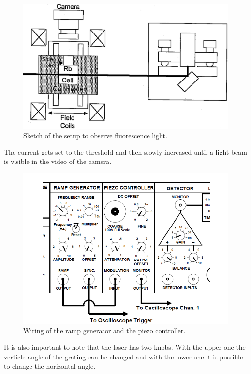 \begin{figure}[H]
	\centering
	\includegraphics[width=\textwidth]{setup_fluorescence.png}
	\caption{Sketch of the setup to observe fluorescence light. \cite{V60}}
	\label{fig:fl}
\end{figure}

\noindent
The current gets set to the threshold and then slowly increased until a light beam is visible in the video of the 
camera.

\begin{figure}[H]
	\centering
	\includegraphics[width=\textwidth]{setup.png}
	\caption{Wiring of the ramp generator and the piezo controller. \cite{V60}}
	\label{fig:rg}
\end{figure}

\noindent
It is also important to note that the laser has two knobs. With the upper one the verticle angle of the grating can
be changed and with the lower one it is possible to change the horizontal angle.

